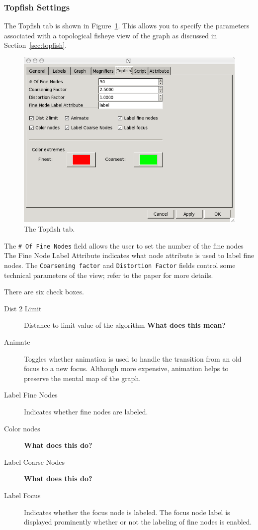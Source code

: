 \subsubsection{Topfish Settings}
The Topfish tab is shown in Figure~\ref{fig:topfish}.
This allows you to specify the parameters associated with a topological fisheye view of the
graph as discussed in Section~\ref{sec:topfish}.
\begin{figure}[ht]
\begin{center}
\includegraphics[scale=.5]{figures/topfish.png}
\caption{\small The Topfish tab.}
\label{fig:topfish}
\end{center}
\end{figure}
The {\tt \# Of Fine Nodes} field allows the user to set the number of the fine nodes 
The {Fine Node Label Attribute} indicates what node attribute is used to label fine nodes.
The {\tt Coarsening factor} and {\tt Distortion Factor} fields control some technical
parameters of the view; refer to the paper for more details.

There are six check boxes.
\begin{description}
\item[Dist 2 Limit] Distance to limit value of the algorithm  {\bf What does this mean?}
\item[Animate] Toggles whether animation is used to handle the transition from an old focus to
a new focus. Although more expensive, animation helps to preserve the mental map of the graph.
\item[Label Fine Nodes] Indicates whether fine nodes are labeled.
\item[Color nodes]  {\bf What does this do?}
\item[Label Coarse Nodes] {\bf What does this do?}
\item[Label Focus] Indicates whether the focus node is labeled. The focus node label is
displayed prominently whether or not the labeling of fine nodes is enabled.
\end{description}

